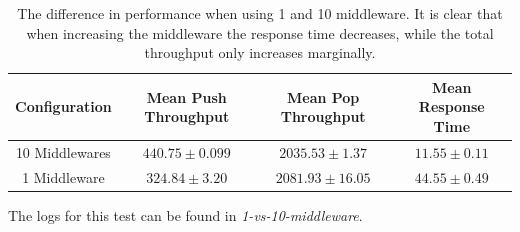 \documentclass{article}
\begin{document}
            \begin{table}
            	\begin{tabular}{|c|c|c|c|}
            	\hline 
            	Configuration & Mean Push Throughput & Mean Pop Throughput & Mean Response Time \\ 
            	\hline 
            	10 Middlewares & $440.75  \pm 0.099$ & $2035.53 \pm 1.37$ & $11.55 \pm 0.11$ \\ 
            	\hline 
            	1 Middleware & $324.84 \pm 3.20$ & $2081.93 \pm 16.05$ & $44.55 \pm 0.49$ \\ 
            	\hline 
            	\end{tabular} 
                \caption{The difference in performance when using 1 and 10 middleware. It is clear that when increasing the middleware the response time decreases, while the total throughput  only increases marginally.}
                \label{tbl:differnce_1_and_10_mw}
            \end{table}
            
        The logs for this test can be found in \textit{1-vs-10-middleware}.
\end{document}
